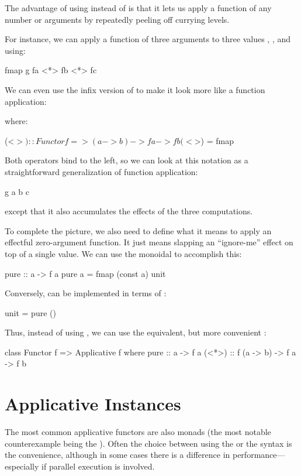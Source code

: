 \documentclass[DaoFP]{subfiles}
\begin{document}
The advantage of using \hask{<*>} instead of \hask{>*<} is that it lets us apply a function of any number or arguments by repeatedly peeling off currying levels. 

For instance, we can apply a function of three arguments  to three values , , and  using:
\begin{haskell}
fmap g fa <*> fb <*> fc
\end{haskell}
We can even use the infix version \index{\hask{<$>}}\hask{<$>} of  to make it look more like a function application:
where:
\begin{haskell}
(<$>) :: Functor f => (a -> b) -> f a -> f b
(<$>) = fmap
\end{haskell}
Both operators bind to the left, so we can look at this notation as a straightforward generalization of function application:
\begin{haskell}
g a b c
\end{haskell}
except that it also accumulates the effects of the three computations.

To complete the picture, we also need to define what it means to apply an effectful zero-argument function. It just means slapping an ``ignore-me'' effect on top of a single value. We can use the monoidal  to accomplish this:
\begin{haskell}
pure :: a -> f a
pure a = fmap (const a) unit
\end{haskell}
Conversely,  can be implemented in terms of :
\begin{haskell}
unit = pure ()
\end{haskell}

Thus, instead of using , we can use the equivalent, but more convenient :
\begin{haskell}
class Functor f => Applicative f where
    pure  :: a -> f a
    (<*>) :: f (a -> b) -> f a -> f b
\end{haskell}

\section{Applicative Instances}

The most common applicative functors are also monads (the most notable counterexample being the ). Often the choice between using the  or the  syntax is the convenience, although in some cases there is a difference in performance---especially if parallel execution is involved.
\end{document}
